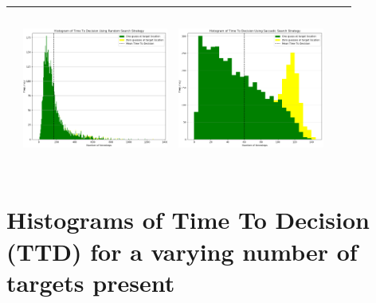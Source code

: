 \begin{landscape}
\begin{table}[h!]
\begin{tabular}{ | m{8mm} | c | c | c | c |}
\begin{minipage}[c][58mm][c]{48mm}
    \end{minipage}
    &
    \begin{minipage}[c][58mm][c]{48mm}
      \includegraphics[width=48mm, height=52mm]{Chapters/MultiAgentTargetDetection/Figs/Histograms/MiscalibratedSensor/05-02/05-02RandomHistogram.png}
    \end{minipage}
    &
    \begin{minipage}[c][58mm][c]{48mm}
      \includegraphics[width=48mm, height=52mm]{Chapters/MultiAgentTargetDetection/Figs/Histograms/MiscalibratedSensor/05-02/05-02SaccadicHistogram.png}
    \end{minipage}
    \\
    \hline
   
  \end{tabular}
  \label{table:HistVaryingSensorModelParams}
\end{table}
\break



\vspace*{\fill}
\section{Histograms of Time To Decision (TTD) for a varying number of targets present}


\end{landscape}
